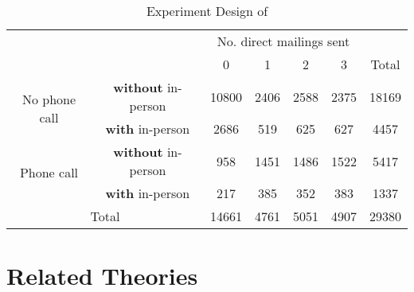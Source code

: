 \documentclass[twoside]{article}
\theoremstyle{definition}
\begin{document}
\begin{table}[ht]
\caption{Experiment Design of \citet{gerber2000effects}}\label{tab:gerber2000design}
\centering
    \begin{tabular}{ccccccc}
             & & \multicolumn{4}{c}{No. direct mailings sent} & \\ \cline{3-6}
            & & 0 & 1 & 2 & 3 & Total\\ 
        \hline
        \multirow{2}{*}{No phone call} & \textbf{without} in-person &  10800 & 2406 & 2588 & 2375 & 18169 \\
         & \textbf{with} in-person & 2686 & 519 & 625 & 627 & 4457\\
         \multirow{2}{*}{Phone call} & \textbf{without} in-person &  958 & 1451 & 1486 & 1522 & 5417 \\
         & \textbf{with} in-person & 217 & 385 & 352 & 383 & 1337\\
        \hline
        \multicolumn{2}{c}{Total} & 14661 & 4761 & 5051 & 4907 & 29380\\
    \end{tabular}
\end{table}



\subsubsection*{\citet*{gerber2008social}}

\subsection*{\citet*{washington2006black}}

\section{Related Theories}



\newpage


\end{document}

